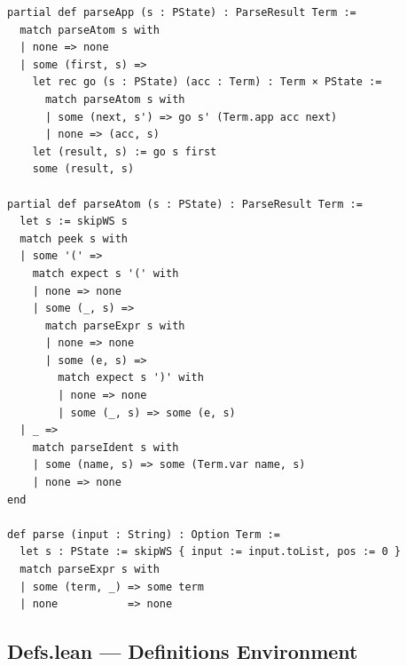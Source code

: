 \documentclass[11pt,a4paper]{article}
\theoremstyle{definition}
\begin{document}
\begin{verbatim}
partial def parseApp (s : PState) : ParseResult Term :=
  match parseAtom s with
  | none => none
  | some (first, s) =>
    let rec go (s : PState) (acc : Term) : Term × PState :=
      match parseAtom s with
      | some (next, s') => go s' (Term.app acc next)
      | none => (acc, s)
    let (result, s) := go s first
    some (result, s)

partial def parseAtom (s : PState) : ParseResult Term :=
  let s := skipWS s
  match peek s with
  | some '(' =>
    match expect s '(' with
    | none => none
    | some (_, s) =>
      match parseExpr s with
      | none => none
      | some (e, s) =>
        match expect s ')' with
        | none => none
        | some (_, s) => some (e, s)
  | _ =>
    match parseIdent s with
    | some (name, s) => some (Term.var name, s)
    | none => none
end

def parse (input : String) : Option Term :=
  let s : PState := skipWS { input := input.toList, pos := 0 }
  match parseExpr s with
  | some (term, _) => some term
  | none           => none
\end{verbatim}

\subsection*{Defs.lean --- Definitions Environment}
\end{document}

